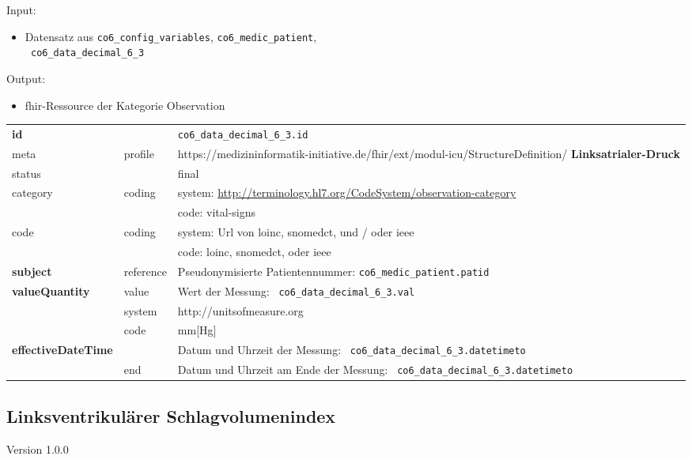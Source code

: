\noindent Input:
\begin{itemize}
	\item Datensatz aus \texttt{co6\_config\_variables}, \texttt{co6\_medic\_patient}, \\ \texttt{
co6\_data\_decimal\_6\_3}
\end{itemize}
Output:
\begin{itemize}
        \item \ac{fhir}-Ressource der Kategorie \glqq Observation\grqq{}
\end{itemize}
\begin{longtable}{|l|l|p{7.5cm}|}
        \hline
        \rowcolor{lightgray} \multicolumn{3}{|l|}{Data Mapping (inhaltlich)} \\ \hline
        \textbf{id} &  & \texttt{co6\_data\_decimal\_6\_3.id} \\ \hline
	meta & profile & https://medizininformatik-initiative.de/fhir/ext/modul-icu/StructureDefinition/\textbf{
Linksatrialer-Druck} \\ \hline 
	status &  & final   \\ \hline 
	category & coding & system: \url{http://terminology.hl7.org/CodeSystem/observation-category} \\
\cline{3-3}
	& & code: vital-signs \\ \hline
	code & coding & system: Url von \ac{loinc}, \ac{snomedct}, und / oder \ac{ieee} \\ 
	\cline{3-3} 
	 &  & code: \ac{loinc}, \ac{snomedct}, oder \ac{ieee} \\ \hline
	 \textbf{subject}  & reference & Pseudonymisierte Patientennummer: \texttt{co6\_medic\_patient.patid} \\ \hline
	 \textbf{valueQuantity}  & value & Wert der Messung: \texttt{
co6\_data\_decimal\_6\_3.val} \\
        \cline{2-3}
         & system & http://unitsofmeasure.org \\
         \cline{2-3}
         & code & mm[Hg] \\ \hline
     \textbf{effectiveDateTime}  & & Datum und Uhrzeit der Messung: \texttt{
co6\_data\_decimal\_6\_3.datetimeto} \\
    \cline{2-3}
     & end & Datum und Uhrzeit am Ende der Messung: \texttt{
co6\_data\_decimal\_6\_3.datetimeto} \\ \hline
\end{longtable}


\subsection{Linksventrikulärer Schlagvolumenindex} 
\noindent Version 1.0.0

